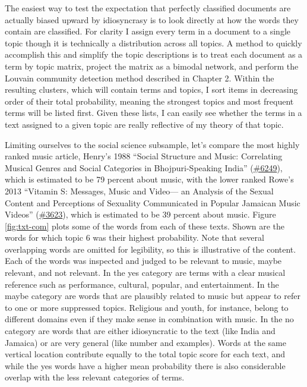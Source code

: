 \documentclass[]{book}
\theoremstyle{definition}
\theoremstyle{definition}
\theoremstyle{definition}
\theoremstyle{remark}
\begin{document}
The easiest way to test the expectation that perfectly classified
documents are actually biased upward by idiosyncrasy is to look directly
at how the words they contain are classified. For clarity I assign every
term in a document to a single topic though it is technically a
distribution across all topics. A method to quickly accomplish this and
simplify the topic descriptions is to treat each document as a term by
topic matrix, project the matrix as a bimodal network, and perform the
Louvain community detection method described in Chapter 2. Within the
resulting clusters, which will contain terms and topics, I sort items in
decreasing order of their total probability, meaning the strongest
topics and most frequent terms will be listed first. Given these lists,
I can easily see whether the terms in a text assigned to a given topic
are really reflective of my theory of that topic.

Limiting ourselves to the social science subsample, let's compare the
most highly ranked music article, Henry's 1988 ``Social Structure and
Music: Correlating Musical Genres and Social Categories in
Bhojpuri-Speaking India''
(\href{www.jstor.org/stable/10.2307/836786}{\#6249}), which is estimated
to be 79 percent about music, with the lower ranked Rowe's 2013
``Vitamin S: Messages, Music and Video--- an Analysis of the Sexual
Content and Perceptions of Sexuality Communicated in Popular Jamaican
Music Videos'' (\href{www.jstor.org/stable/10.2307/24384502}{\#3623}),
which is estimated to be 39 percent about music. Figure
\ref{fig:txt-com} plots some of the words from each of these texts.
Shown are the words for which topic 6 was their highest probability.
Note that several overlapping words are omitted for legibility, so this
is illustrative of the content. Each of the words was inspected and
judged to be relevant to music, maybe relevant, and not relevant. In the
yes category are terms with a clear musical reference such as
performance, cultural, popular, and entertainment. In the maybe category
are words that are plausibly related to music but appear to refer to one
or more suppressed topics. Religious and youth, for instance, belong to
different domains even if they make sense in combination with music. In
the no category are words that are either idiosyncratic to the text
(like India and Jamaica) or are very general (like number and examples).
Words at the same vertical location contribute equally to the total
topic score for each text, and while the yes words have a higher mean
probability there is also considerable overlap with the less relevant
categories of terms.
\end{document}
